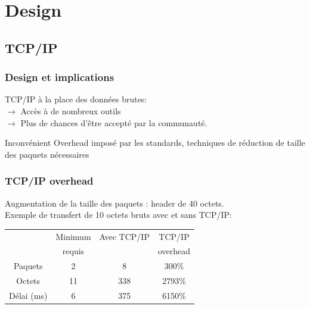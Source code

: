 \section{Design}
\subsection{TCP/IP}
\begin{frame}
 \frametitle{Design et implications}
 TCP/IP à la place des données brutes:\\
 \vspace{5mm}
 \textbf{$\rightarrow$} Accès à de nombreux outils\\
 \textbf{$\rightarrow$} Plus de chances d'être accepté par la communauté.\\
 \vspace{5mm}
\begin{block}{Inconvénient}
Overhead imposé par les standards, techniques de réduction de taille des paquets nécessaires
\end{block}
 
\end{frame}
\begin{frame}
\frametitle{TCP/IP overhead}
Augmentation de la taille des paquets : header de 40 octets.\\
\vspace{5mm}
Exemple de transfert de 10 octets bruts avec et sans TCP/IP: \\
\begin{center}
\begin{tabular}{|c|c|c|c|}
\hline
~ & Minimum & Avec TCP/IP & TCP/IP\\
~ & requis & ~ & overhead\\
\hline
Paquets & 2 & 8 & 300\% \\
Octets & 11 & 338 & 2793\% \\
Délai (ms) & 6 & 375 & 6150\% \\
\hline
\end{tabular}
\end{center}
\end{frame}
